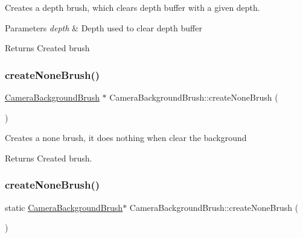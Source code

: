 Creates a depth brush, which clears depth buffer with a given depth. 
\begin{DoxyParams}{Parameters}
{\em depth} & Depth used to clear depth buffer \\
\hline
\end{DoxyParams}
\begin{DoxyReturn}{Returns}
Created brush 
\end{DoxyReturn}
\mbox{\label{classCameraBackgroundBrush_abe7e4c281012b34fc0eab9d4d3b4ba65}} 
\subsubsection{\texorpdfstring{create\+None\+Brush()}{createNoneBrush()}\hspace{0.1cm}{\footnotesize\ttfamily [1/2]}}
{\footnotesize\ttfamily \hyperlink{classCameraBackgroundBrush}{Camera\+Background\+Brush} $\ast$ Camera\+Background\+Brush\+::create\+None\+Brush (\begin{DoxyParamCaption}{ }\end{DoxyParamCaption})\hspace{0.3cm}{\ttfamily [static]}}

Creates a none brush, it does nothing when clear the background \begin{DoxyReturn}{Returns}
Created brush. 
\end{DoxyReturn}
\mbox{\label{classCameraBackgroundBrush_ae2b6946502a56aa52618255e1a18653b}} 
\subsubsection{\texorpdfstring{create\+None\+Brush()}{createNoneBrush()}\hspace{0.1cm}{\footnotesize\ttfamily [2/2]}}
{\footnotesize\ttfamily static \hyperlink{classCameraBackgroundBrush}{Camera\+Background\+Brush}$\ast$ Camera\+Background\+Brush\+::create\+None\+Brush (\begin{DoxyParamCaption}{ }\end{DoxyParamCaption})\hspace{0.3cm}{\ttfamily [static]}}

